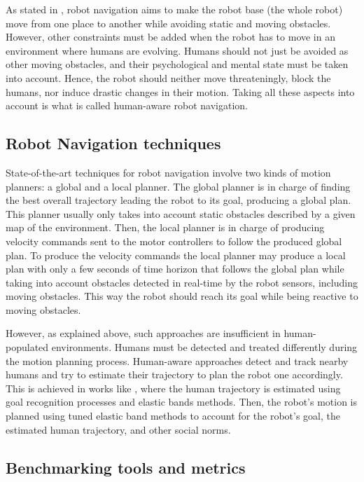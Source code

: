 As stated in \cite{thesisBuisan21}, robot navigation aims to make the robot base (the whole robot) move from one place to another while avoiding static and moving obstacles. However, other constraints must be added when the robot has to move in an environment where humans are evolving. 
Humans should not just be avoided as other moving obstacles, and their psychological and mental state must be taken into account. Hence, the robot should neither move threateningly, block the humans, nor induce drastic changes in their motion. Taking all these aspects into account is what is called human-aware robot navigation.

\subsection{Robot Navigation techniques}

State-of-the-art techniques for robot navigation involve two kinds of motion planners: a global and a local planner. The global planner is in charge of finding the best overall trajectory leading the robot to its goal, producing a global plan. This planner usually only takes into account static obstacles described by a given map of the environment. Then, the local planner is in charge of producing velocity commands sent to the motor controllers to follow the produced global plan. To produce the velocity commands the local planner may produce a local plan with only a few seconds of time horizon that follows the global plan while taking into account obstacles detected in real-time by the robot sensors, including moving obstacles. This way the robot should reach its goal while being reactive to moving obstacles. 

However, as explained above, such approaches are insufficient in human-populated environments. Humans must be detected and treated differently during the motion planning process. Human-aware approaches detect and track nearby humans and try to estimate their trajectory to plan the robot one accordingly. This is achieved in works like \cite{singamaneni2021human}, where the human trajectory is estimated using goal recognition processes and elastic bands methods. Then, the robot's motion is planned using tuned elastic band methods to account for the robot's goal, the estimated human trajectory, and other social norms.   

\subsection{Benchmarking tools and metrics}

